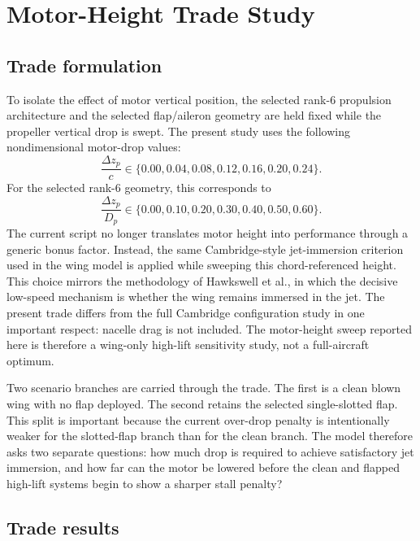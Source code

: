 \documentclass[conf]{new-aiaa}
\begin{document}
\section{Motor-Height Trade Study}

\subsection{Trade formulation}

To isolate the effect of motor vertical position, the selected rank-6 propulsion architecture and the selected flap/aileron geometry are held fixed while the propeller vertical drop is swept. The present study uses the following nondimensional motor-drop values:
\begin{equation}
\frac{\Delta z_p}{c} \in \{0.00, 0.04, 0.08, 0.12, 0.16, 0.20, 0.24\}.
\end{equation}
For the selected rank-6 geometry, this corresponds to
\begin{equation}
\frac{\Delta z_p}{D_p} \in \{0.00, 0.10, 0.20, 0.30, 0.40, 0.50, 0.60\}.
\end{equation}
The current script no longer translates motor height into performance through a generic bonus factor. Instead, the same Cambridge-style jet-immersion criterion used in the wing model is applied while sweeping this chord-referenced height.
This choice mirrors the methodology of Hawkswell et al., in which the decisive low-speed mechanism is whether the wing remains immersed in the jet.\cite{Hawkswell2022} The present trade differs from the full Cambridge configuration study in one important respect: nacelle drag is not included. The motor-height sweep reported here is therefore a wing-only high-lift sensitivity study, not a full-aircraft optimum.

Two scenario branches are carried through the trade. The first is a clean blown wing with no flap deployed. The second retains the selected single-slotted flap. This split is important because the current over-drop penalty is intentionally weaker for the slotted-flap branch than for the clean branch. The model therefore asks two separate questions: how much drop is required to achieve satisfactory jet immersion, and how far can the motor be lowered before the clean and flapped high-lift systems begin to show a sharper stall penalty?

\subsection{Trade results}
\end{document}
